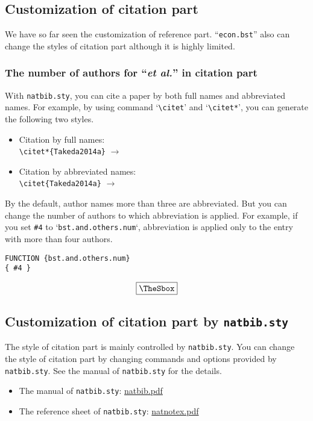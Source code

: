 \documentclass[10pt]{article}
\newenvironment{Frame}%
{\setlength{\fboxsep}{15pt}
\setlength{\mylength}{\linewidth}%
\addtolength{\mylength}{-2\fboxsep}%
\addtolength{\mylength}{-2\fboxrule}%
\Sbox
\minipage{\mylength}%
\setlength{\abovedisplayskip}{0pt}%
\setlength{\belowdisplayskip}{0pt}%
}%
{\endminipage\endSbox
\[\fbox{\TheSbox}\]}
\begin{document}
\subsection{Customization of citation part}

We have so far seen the customization of reference part. ``\texttt{econ.bst}''
also can change the styles of citation part although it is highly limited.

\subsubsection{The number of authors for ``\textit{et al.}'' in citation part}

With \texttt{natbib.sty}, you can cite a paper by both full names and
abbreviated names. For example, by using command `\verb|\citet|' and
`\verb|\citet*|', you can generate the following two styles.
\begin{itemize}
 \item Citation by full names: \\
       \verb|\citet*{Takeda2014a}| $\longrightarrow$ \citet*{Takeda2014a}
 \item Citation by abbreviated names: \\
       \verb|\citet{Takeda2014a}| $\longrightarrow$ \citet{Takeda2014a}
\end{itemize}

By the default, author names more than three are abbreviated. But you can change
the number of authors to which abbreviation is applied.  For example, if you set
\verb|#4| to `\texttt{bst.and.others.num}`, abbreviation is applied only to the
entry with more than four authors.
\begin{Frame}
\begin{verbatim}
FUNCTION {bst.and.others.num}
{ #4 }
\end{verbatim} 
\end{Frame}

\subsection{Customization of citation part by \texttt{natbib.sty}}

The style of citation part is mainly controlled by \texttt{natbib.sty}. You can
change the style of citation part by changing commands and options provided by
\texttt{natbib.sty}.
See the manual of \texttt{natbib.sty} for the details. 
\begin{itemize}
 \item The manual of \texttt{natbib.sty}:
       \href{http://ctan.math.utah.edu/ctan/tex-archive/macros/latex/contrib/natbib/natbib.pdf}{natbib.pdf}
 \item The reference sheet of \texttt{natbib.sty}:
       \href{http://mirror.las.iastate.edu/tex-archive/macros/latex/contrib/natbib/natnotes.pdf}{natnotex.pdf}
\end{itemize}
\end{document}
